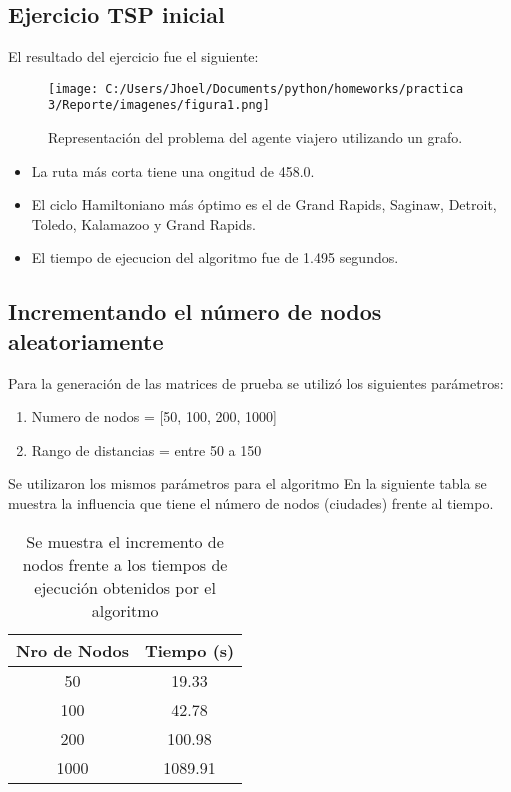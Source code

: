 \documentclass[]{report}
\begin{document}
	\subsection{Ejercicio TSP inicial}
	El resultado del ejercicio fue el siguiente:\\
	\begin{figure}[ht]
		\centering
		\texttt{[image: C:/Users/Jhoel/Documents/python/homeworks/practica 3/Reporte/imagenes/figura1.png]}
		\caption{Representación del problema del agente viajero utilizando un grafo.}
	\end{figure}
	\begin{itemize}
		\item La ruta más corta tiene una ongitud de 458.0.\\
		\item El ciclo Hamiltoniano más óptimo es el de Grand Rapids, Saginaw, Detroit, Toledo, Kalamazoo y Grand Rapids.
		\item El tiempo de ejecucion del algoritmo fue de 1.495 segundos.
	\end{itemize}
	\subsection{Incrementando el número de nodos aleatoriamente}
	Para la generación de las matrices de prueba se utilizó los siguientes parámetros:
	\begin{enumerate}
		\item Numero de nodos = [50, 100, 200, 1000]
		\item Rango de distancias = entre 50 a 150
	\end{enumerate}
	Se utilizaron los mismos parámetros para el algoritmo
	En la siguiente tabla se muestra la influencia que tiene el número de nodos (ciudades) frente al tiempo.
	
	\begin{table}[ht]
		\centering
		\begin{tabular}{cc}
			\hline
			Nro de Nodos & Tiempo (s)\\
			\hline
			50 & 19.33\\
			100 & 42.78\\
			200 & 100.98\\
			1000 & 1089.91\\
			\hline
		\end{tabular}
		\caption{Se muestra el incremento de nodos frente a los tiempos de ejecución obtenidos por el algoritmo}
	\end{table}
	
\end{document}

